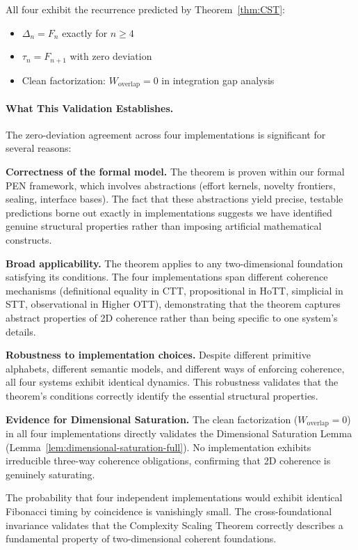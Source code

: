 \documentclass[11pt]{article}
\theoremstyle{definition}
\theoremstyle{remark}
\begin{document}
All four exhibit the recurrence predicted by Theorem~\ref{thm:CST}:
\begin{itemize}
\item $\Delta_n = F_n$ exactly for $n \geq 4$
\item $\tau_n = F_{n+1}$ with zero deviation
\item Clean factorization: $W_{\text{overlap}} = 0$ in integration gap analysis
\end{itemize}

\paragraph{What This Validation Establishes.}

The zero-deviation agreement across four implementations is significant for several reasons:

\textbf{Correctness of the formal model.} The theorem is proven within our formal PEN framework, which involves abstractions (effort kernels, novelty frontiers, sealing, interface bases). The fact that these abstractions yield precise, testable predictions borne out exactly in implementations suggests we have identified genuine structural properties rather than imposing artificial mathematical constructs.

\textbf{Broad applicability.} The theorem applies to any two-dimensional foundation satisfying its conditions. The four implementations span different coherence mechanisms (definitional equality in CTT, propositional in HoTT, simplicial in STT, observational in Higher OTT), demonstrating that the theorem captures abstract properties of 2D coherence rather than being specific to one system's details.

\textbf{Robustness to implementation choices.} Despite different primitive alphabets, different semantic models, and different ways of enforcing coherence, all four systems exhibit identical dynamics. This robustness validates that the theorem's conditions correctly identify the essential structural properties.

\textbf{Evidence for Dimensional Saturation.} The clean factorization ($W_{\text{overlap}} = 0$) in all four implementations directly validates the Dimensional Saturation Lemma (Lemma~\ref{lem:dimensional-saturation-full}). No implementation exhibits irreducible three-way coherence obligations, confirming that 2D coherence is genuinely saturating.

The probability that four independent implementations would exhibit identical Fibonacci timing by coincidence is vanishingly small. The cross-foundational invariance validates that the Complexity Scaling Theorem correctly describes a fundamental property of two-dimensional coherent foundations.
\end{document}
